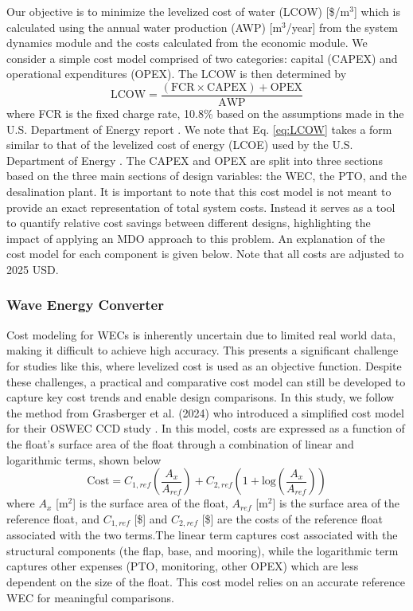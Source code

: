 \documentclass[twocolumn,10pt]{asme2e}
\begin{document}
Our objective is to minimize the levelized cost of water (LCOW) [\$/m$^3$] which is calculated using the annual water production (AWP) [m$^3$/year] from the system dynamics module and the costs calculated from the economic module. We consider a simple cost model comprised of two categories: capital (CAPEX) and operational expenditures (OPEX). The LCOW is then determined by
\begin{equation}
    \text{LCOW} = \frac{(\text{FCR}\times\text{CAPEX}) + \text{OPEX}}{\text{AWP}}
    \label{eq:LCOW}
\end{equation}
\noindent where FCR is the fixed charge rate, 10.8\% based on the assumptions made in the U.S. Department of Energy report \cite{LCOE_DOE}. We note that Eq. \ref{eq:LCOW} takes a form similar to that of the levelized cost of energy (LCOE) used by the U.S. Department of Energy \cite{LCOE_DOE}. The CAPEX and OPEX are split into three sections based on the three main sections of design variables: the WEC, the PTO, and the desalination plant. It is important to note that this cost model is not meant to provide an exact representation of total system costs. Instead it serves as a tool to quantify relative cost savings between different designs, highlighting the impact of applying an MDO approach to this problem. An explanation of the cost model for each component is given below. Note that all costs are adjusted to 2025 USD.

\subsubsection{Wave Energy Converter}

Cost modeling for WECs is inherently uncertain due to limited real world data, making it difficult to achieve high accuracy. This presents a significant challenge for studies like this, where levelized cost is used as an objective function. Despite these challenges, a practical and comparative cost model can still be developed to capture key cost trends and enable design comparisons. In this study, we follow the method from Grasberger et al. (2024) who introduced a simplified cost model for their OSWEC CCD study \cite{Grasberger2024}. In this model, costs are expressed as a function of the float's surface area of the float through a combination of linear and logarithmic terms, shown below
\begin{equation}
    \text{Cost} = C_{1,ref}\left(\frac{A_{x}}{A_{ref}}\right) + C_{2,ref}\left(1 + \text{log}\left(\frac{A_{x}}{A_{ref}}\right)\right)
\end{equation}
\noindent where $A_{x}$ [m$^2$] is the surface area of the float, $A_{ref}$ [m$^2$] is the surface area of the reference float, and $C_{1,ref}$ [\$] and $C_{2,ref}$ [\$] are the costs of the reference float associated with the two terms.The linear term captures cost associated with the structural components (the flap, base, and mooring), while the logarithmic term captures other expenses (PTO, monitoring, other OPEX) which are less dependent on the size of the float. This cost model relies on an accurate reference WEC for meaningful comparisons.
\end{document}
